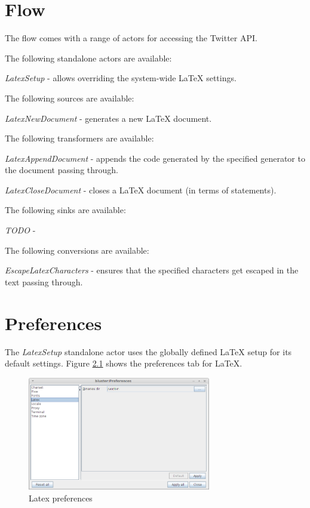 \documentclass[a4paper]{book}
\begin{document}
\chapter{Flow}
The flow comes with a range of actors for accessing the Twitter API.

\noindent The following standalone actors are available:
\begin{tight_itemize}
	\item \textit{LatexSetup} - allows overriding the system-wide
	LaTeX settings.
\end{tight_itemize}

\noindent The following sources are available:
\begin{tight_itemize}
	\item \textit{LatexNewDocument} - generates a new LaTeX document.
\end{tight_itemize}

\noindent The following transformers are available:
\begin{tight_itemize}
	\item \textit{LatexAppendDocument} - appends the code generated by the
	specified generator to the document passing through.
	\item \textit{LatexCloseDocument} - closes a LaTeX document (in terms of statements).
\end{tight_itemize}

\noindent The following sinks are available:
\begin{tight_itemize}
	\item \textit{TODO} -
\end{tight_itemize}

\noindent The following conversions are available:
\begin{tight_itemize}
	\item \textit{EscapeLatexCharacters} - ensures that the specified
	characters get escaped in the text passing through.
\end{tight_itemize}

\chapter{Preferences}
\label{preferences}
The \textit{LatexSetup} standalone actor uses the globally defined
LaTeX setup for its default settings.
Figure \ref{latex_preferences} shows the preferences tab for LaTeX.
\begin{figure}[htb]
  \centering
  \includegraphics[width=8.0cm]{images/latex_preferences.png}
  \caption{Latex preferences}
  \label{latex_preferences}
\end{figure}


\end{document}
